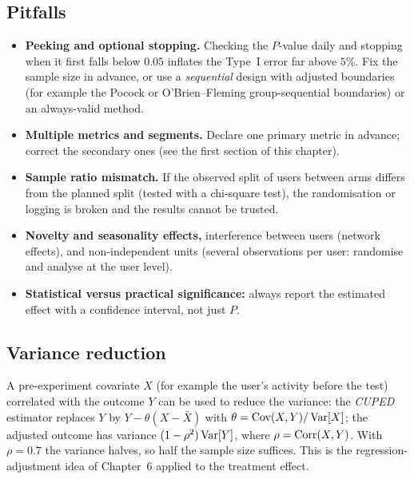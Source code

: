 \subsection{Pitfalls}

\begin{itemize}
  \item \textbf{Peeking and optional stopping.} Checking the $P$-value daily and stopping when it first falls below $0.05$ inflates the Type~I error far above $5\%$. Fix the sample size in advance, or use a \emph{sequential} design with adjusted boundaries (for example the Pocock or O'Brien--Fleming group-sequential boundaries) or an always-valid method.
  \item \textbf{Multiple metrics and segments.} Declare one primary metric in advance; correct the secondary ones (see the first section of this chapter).
  \item \textbf{Sample ratio mismatch.} If the observed split of users between arms differs from the planned split (tested with a chi-square test), the randomisation or logging is broken and the results cannot be trusted.
  \item \textbf{Novelty and seasonality effects,} interference between users (network effects), and non-independent units (several observations per user: randomise and analyse at the user level).
  \item \textbf{Statistical versus practical significance:} always report the estimated effect with a confidence interval, not just $P$.
\end{itemize}

\subsection{Variance reduction}

A pre-experiment covariate $X$ (for example the user's activity before the test) correlated with the outcome $Y$ can be used to reduce the variance: the \emph{CUPED} estimator replaces $Y$ by $Y-\theta(X-\bar{X})$ with $\theta=\operatorname{Cov}(X,Y)/\operatorname{Var}[X]$; the adjusted outcome has variance $(1-\rho^2)\operatorname{Var}[Y]$, where $\rho=\operatorname{Corr}(X,Y)$. With $\rho=0.7$ the variance halves, so half the sample size suffices. This is the regression-adjustment idea of Chapter~6 applied to the treatment effect.

